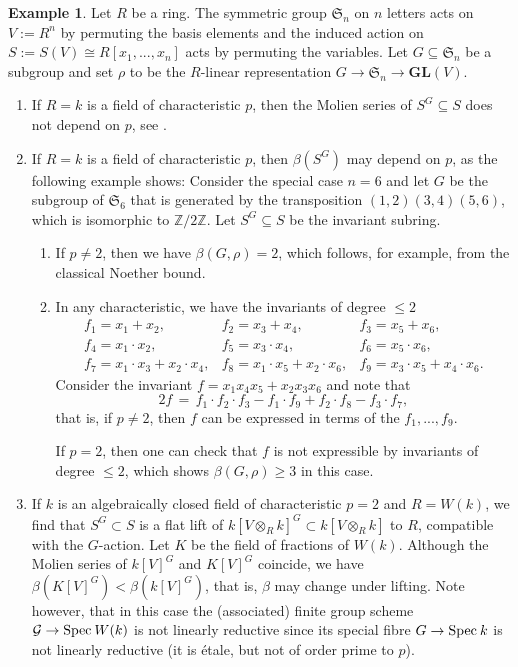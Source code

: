 \documentclass[reqno]{amsart}
\newcommand{\ZZ}{{\mathbb{Z}}}
\newcommand{\Spec}{{\rm Spec}\:}
\newcommand{\GL}{{\mathbf{GL}}}
\theoremstyle{definition}
\newtheorem{Example}[Definition]{Example}
\theoremstyle{plain}
\begin{document}
\begin{Example}
 Let $R$ be a ring.
 The symmetric group $\mathfrak{S}_n$ on $n$ letters acts on 
 $V:=R^n$ by permuting the basis elements and the induced action on 
 $S:=S(V)\cong R[x_1,...,x_n]$ acts by permuting the variables.
  Let $G\subseteq\mathfrak{S}_n$ be a subgroup
  and set $\rho$ to be the $R$-linear representation $G\to\mathfrak{S}_n\to\GL(V)$.
  \begin{enumerate}
  \item If $R=k$ is a field of characteristic $p$, then the Molien series
  of $S^G\subseteq S$ does not depend on $p$, see \cite[Proposition 3.4.4]{DK}. 
  \item If $R=k$ is a field of characteristic $p$, then $\beta(S^G)$ 
  may depend on $p$, as the following example
  shows:
 Consider the special case $n=6$ and let $G$ be the subgroup of 
 $\mathfrak{S}_6$ that is generated by the transposition $(1,2)(3,4)(5,6)$, which is isomorphic to $\ZZ/2\ZZ$.
 Let $S^G\subseteq S$ be the invariant subring.
 \begin{enumerate}
 \item If $p\neq2$, then we have $\beta(G, \rho)=2$, which follows, for example,
 from the classical Noether bound.
 \item 
 In any characteristic, we have the invariants of degree $\leq2$
  $$
  \begin{array}{lll}
    f_1 = x_1 + x_2,&
    f_2 = x_3 + x_4,&
    f_3 = x_5 + x_6,\\
    f_4 = x_1\cdot x_2,&
    f_5 = x_3\cdot x_4,&
    f_6 = x_5\cdot x_6,\\
    f_7 = x_1\cdot x_3 + x_2\cdot x_4,&
    f_8 = x_1\cdot x_5 + x_2\cdot x_6,&
    f_9 = x_3\cdot x_5 + x_4\cdot x_6.
    \end{array}
  $$
  Consider the invariant $f=x_1x_4x_5+x_2x_3x_6$ and note that
  $$
  2f \,=\, f_1\cdot f_2\cdot f_3 - f_1\cdot f_9  + f_2\cdot f_8 - f_3\cdot f_7,
  $$
  that is, if $p\neq2$, then $f$ can be expressed in terms of the $f_1,...,f_9$.
 
  If $p=2$, then one can check that $f$ is not expressible by invariants of degree $\leq2$,
  which shows $\beta(G,\rho)\geq3$ in this case.
  \end{enumerate}
  \item If $k$ is an algebraically closed field of characteristic $p=2$ and 
  $R=W(k)$, we find that $S^G\subset S$ is a flat lift of 
  $k[V\otimes_Rk]^G\subset k[V\otimes_Rk]$ to $R$,
  compatible with the $G$-action.
  Let $K$ be the field of fractions of $W(k)$.
  Although the Molien series of $k[V]^G$ and $K[V]^G$ coincide, we have
  $\beta(K[V]^G)<\beta(k[V]^G)$, that is,
  $\beta$ may change under lifting.
  Note however, that in this case
  the (associated) finite group scheme $\mathcal{G}\to\Spec W(k)$ is
  not linearly reductive since its special fibre $G\to\Spec k$ is not linearly reductive
  (it is \'etale, but not of order prime to $p$).
   \end{enumerate}
  \end{Example}
\end{document}
